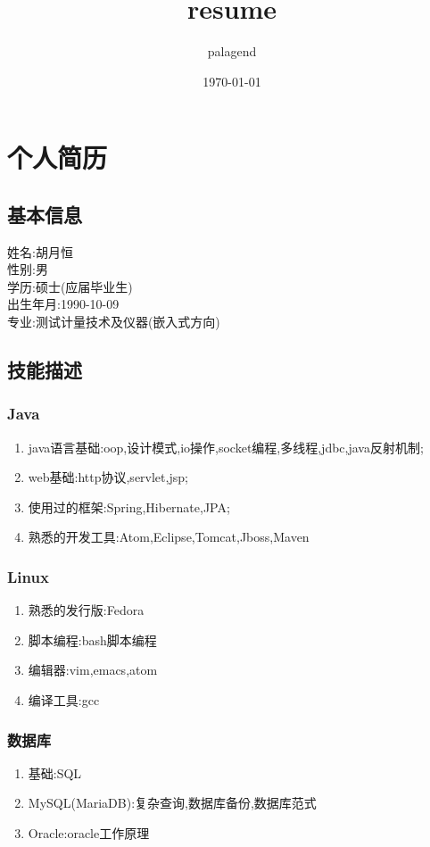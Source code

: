 \documentclass[UTF8]{ctexart}
\author{palagend}
\date{\today}
\title{resume}
\begin{document}
\maketitle
\tableofcontents

\section{个人简历}
\label{sec-1}
\subsection{基本信息}
\label{sec-1-1}
姓名:胡月恒\\
性别:男\\
学历:硕士(应届毕业生)\\
出生年月:1990-10-09\\
专业:测试计量技术及仪器(嵌入式方向)\\
\subsection{技能描述}
\label{sec-1-2}
\subsubsection{Java}
\label{sec-1-2-1}
\begin{enumerate}
\item java语言基础:oop,设计模式,io操作,socket编程,多线程,jdbc,java反射机制;
\item web基础:http协议,servlet,jsp;
\item 使用过的框架:Spring,Hibernate,JPA;
\item 熟悉的开发工具:Atom,Eclipse,Tomcat,Jboss,Maven
\end{enumerate}
\subsubsection{Linux}
\label{sec-1-2-2}
\begin{enumerate}
\item 熟悉的发行版:Fedora
\item 脚本编程:bash脚本编程
\item 编辑器:vim,emacs,atom
\item 编译工具:gcc
\end{enumerate}
\subsubsection{数据库}
\label{sec-1-2-3}
\begin{enumerate}
\item 基础:SQL
\item MySQL(MariaDB):复杂查询,数据库备份,数据库范式
\item Oracle:oracle工作原理
\end{enumerate}
\end{document}
